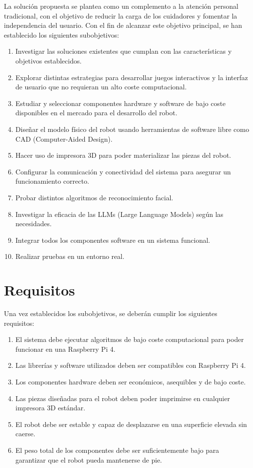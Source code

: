 La solución propuesta se plantea como un complemento a la atención personal tradicional, con el objetivo de reducir la carga de los cuidadores y fomentar la independencia del usuario. Con el fin de alcanzar este objetivo principal, se han establecido los siguientes subobjetivos:


\begin{enumerate}
	\item Investigar las soluciones existentes que cumplan con las características y objetivos establecidos.
	\item Explorar distintas estrategias para desarrollar juegos interactivos y la interfaz de usuario que no requieran un alto coste computacional.
	\item Estudiar y seleccionar componentes hardware y software de bajo coste disponibles en el mercado para el desarrollo del robot.
	\item Diseñar el modelo físico del robot usando herramientas de software libre como CAD (Computer-Aided Design).
	\item Hacer uso de impresora 3D para poder materializar las piezas del robot.
	\item Configurar la comunicación y conectividad del sistema para asegurar un funcionamiento correcto.
	\item Probar distintos algoritmos de reconocimiento facial.
	\item Investigar la eficacia de las LLMs (Large Language Models) según las necesidades.
	\item Integrar todos los componentes software en un sistema funcional.
    \item Realizar pruebas en un entorno real.
\end{enumerate}



\section{Requisitos}
\label{sec:Requisitos}

Una vez establecidos los subobjetivos, se deberán cumplir los siguientes requisitos:

\begin{enumerate}
	\item El sistema debe ejecutar algoritmos de bajo coste computacional para poder funcionar en una Raspberry Pi 4.
	\item Las librerías y software utilizados deben ser compatibles con Raspberry Pi 4.
	\item Los componentes hardware deben ser económicos, asequibles y de bajo coste.
	\item Las piezas diseñadas para el robot deben poder imprimirse en cualquier impresora 3D estándar.
	\item El robot debe ser estable y capaz de desplazarse en una superficie elevada sin caerse.
	\item El peso total de los componentes debe ser suficientemente bajo para garantizar que el robot pueda mantenerse de pie.
\end{enumerate}


